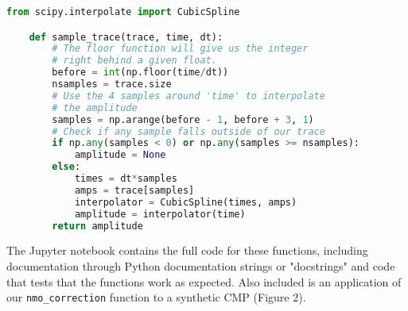 \begin{lstlisting}[language=python]
    from scipy.interpolate import CubicSpline

    def sample_trace(trace, time, dt):
        # The floor function will give us the integer
        # right behind a given float.
        before = int(np.floor(time/dt))
        nsamples = trace.size
        # Use the 4 samples around 'time' to interpolate
        # the amplitude
        samples = np.arange(before - 1, before + 3, 1)
        # Check if any sample falls outside of our trace
        if np.any(samples < 0) or np.any(samples >= nsamples):
            amplitude = None
        else:
            times = dt*samples
            amps = trace[samples]
            interpolator = CubicSpline(times, amps)
            amplitude = interpolator(time)
        return amplitude
\end{lstlisting}

The Jupyter notebook contains the full code for these functions, including
documentation through Python documentation strings or "docstrings" and code that tests that the
functions work as expected.
Also included is an application of our \texttt{nmo\_correction} function to a
synthetic CMP (Figure 2).
